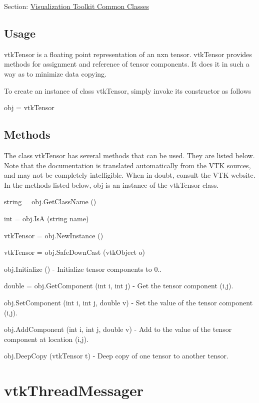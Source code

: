 Section\-: \hyperlink{sec_vtkcommon}{Visualization Toolkit Common Classes} \hypertarget{vtkwidgets_vtkxyplotwidget_Usage}{}\subsection{Usage}\label{vtkwidgets_vtkxyplotwidget_Usage}
vtk\-Tensor is a floating point representation of an nxn tensor. vtk\-Tensor provides methods for assignment and reference of tensor components. It does it in such a way as to minimize data copying.

To create an instance of class vtk\-Tensor, simply invoke its constructor as follows \begin{DoxyVerb}  obj = vtkTensor
\end{DoxyVerb}
 \hypertarget{vtkwidgets_vtkxyplotwidget_Methods}{}\subsection{Methods}\label{vtkwidgets_vtkxyplotwidget_Methods}
The class vtk\-Tensor has several methods that can be used. They are listed below. Note that the documentation is translated automatically from the V\-T\-K sources, and may not be completely intelligible. When in doubt, consult the V\-T\-K website. In the methods listed below, {\ttfamily obj} is an instance of the vtk\-Tensor class. 
\begin{DoxyItemize}
\item {\ttfamily string = obj.\-Get\-Class\-Name ()}  
\item {\ttfamily int = obj.\-Is\-A (string name)}  
\item {\ttfamily vtk\-Tensor = obj.\-New\-Instance ()}  
\item {\ttfamily vtk\-Tensor = obj.\-Safe\-Down\-Cast (vtk\-Object o)}  
\item {\ttfamily obj.\-Initialize ()} -\/ Initialize tensor components to 0..  
\item {\ttfamily double = obj.\-Get\-Component (int i, int j)} -\/ Get the tensor component (i,j).  
\item {\ttfamily obj.\-Set\-Component (int i, int j, double v)} -\/ Set the value of the tensor component (i,j).  
\item {\ttfamily obj.\-Add\-Component (int i, int j, double v)} -\/ Add to the value of the tensor component at location (i,j).  
\item {\ttfamily obj.\-Deep\-Copy (vtk\-Tensor t)} -\/ Deep copy of one tensor to another tensor.  
\end{DoxyItemize}\hypertarget{vtkcommon_vtkthreadmessager}{}\section{vtk\-Thread\-Messager}\label{vtkcommon_vtkthreadmessager}

